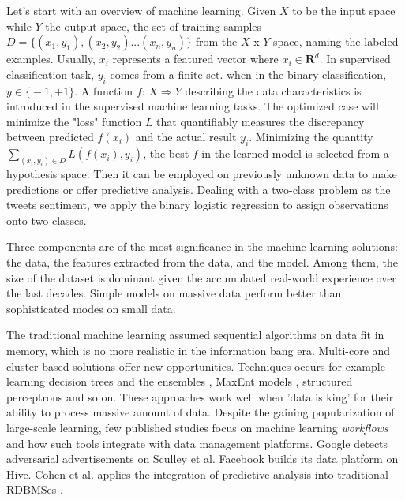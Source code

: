 \documentclass[sigconf]{acmart}
\begin{document}
Let's start with an overview of machine learning. Given $X$ to be the input space while $Y$ the output space, the set of training samples $D = \big\{ (x_1, y_1), (x_2, y_2)...(x_n, y_n) \big\} $ from the $X$ x $Y$ space, naming the labeled examples. Usually, $x_i$ represents a featured vector where $x_i \in \mathbf{R}^d$. In supervised classification task, $y_i$ comes from a finite set. when in the binary classification, $y \in \big\{ -1, +1\big\} $. A function $f$: $X \Rightarrow Y$ describing the data characteristics is introduced in the supervised machine learning tasks. The optimized case will minimize the "loss" function $L$ that quantifiably measures the discrepancy between predicted $f(x_i)$ and the actual result $y_i$. Minimizing the quantity $\sum_{(x_i, y_i) \in D} L(f(x_i), y_i)$, the best $f$ in the learned model is selected from a hypothesis space. Then it can be employed on previously unknown data to make predictions or offer predictive analysis. \cite{christopher2016pattern} \cite{franklin2005elements} Dealing with a two-class problem as the tweets sentiment, we apply the binary logistic regression to assign observations onto  two classes. 

Three components are of the most significance in the machine learning solutions: the data, the features extracted from the data, and the model. Among them, the size of the dataset is dominant given the accumulated real-world experience over the last decades. \cite{halevy2009unreasonable} \cite{lin2010data} Simple models on massive data perform better than sophisticated modes on small data. \cite{banko2001scaling} \cite{brants2007large}

The traditional machine learning assumed sequential algorithms on data fit in memory, which is no more realistic in the information bang era. Multi-core \cite{chu2007map} and cluster-based solutions \cite{agarwal2014reliable} offer new opportunities. Techniques occurs for example learning decision trees and the ensembles \cite{svore2011large}, MaxEnt models \cite{mcdonald2009efficient}, structured perceptrons \cite{mcdonald2010distributed} and so on. These approaches work well when 'data is king' for their ability to process massive amount of data. Despite the gaining popularization of large-scale learning, few published studies focus on machine learning \textit{workflows} and how such tools integrate with data management platforms. Google detects adversarial advertisements on Sculley et al. \cite{sculley2011detecting} Facebook builds its data platform on Hive. \cite{thusoo2010hive} Cohen et al. applies the integration of predictive analysis into traditional RDBMSes \cite{cohen2009mad}. 
\end{document}
